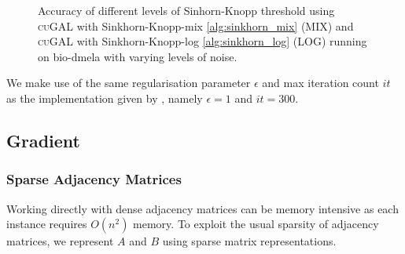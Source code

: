 \sinkthresbdaccu
\begin{figure}[H]
    \centering
    \caption{Accuracy of different levels of Sinhorn-Knopp threshold using \textsc{cuGAL} with Sinkhorn-Knopp-mix \ref{alg:sinkhorn_mix} (MIX) and \textsc{cuGAL} with Sinkhorn-Knopp-log \ref{alg:sinkhorn_log} (LOG) running on bio-dmela with varying levels of noise.}
    \label{fig:SK_accu}
\end{figure}

We make use of the same regularisation parameter $\epsilon$ and max iteration count $it$ as the implementation given by \cite{fugal2024}, namely $\epsilon = 1$ and $it = 300$.

\subsection{Gradient}
\subsubsection{Sparse Adjacency Matrices}
Working directly with dense adjacency matrices can be memory intensive as each instance requires $O(n^2)$ memory. To exploit the usual sparsity of adjacency matrices, we represent $A$ and $B$ using sparse matrix representations.\\

